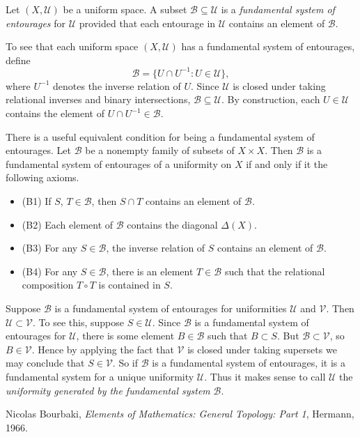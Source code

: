 \documentclass[12pt]{article}
\newcommand{\UU}{\mathcal{U}}
\newcommand{\VV}{\mathcal{V}}
\newcommand{\BB}{\mathcal{B}}
\begin{document}

Let $(X,\UU)$ be a uniform space.  A subset $\BB\subseteq\UU$ is a \emph{fundamental system of entourages} for $\UU$ provided that each entourage in $\UU$ contains an element of $\BB$.

To see that each uniform space $(X,\UU)$ has a fundamental system of entourages, define
\[
\BB = \{ U\cap U^{-1} \colon U \in \UU \},
\]
where $U^{-1}$ denotes the inverse relation of $U$.  Since $\UU$ is closed under taking relational inverses and binary intersections, $\BB\subseteq\UU$.  By construction, each $U\in\UU$ contains the element of $U\cap U^{-1}\in\BB$.

There is a useful equivalent condition for being a fundamental system of entourages.  Let $\BB$ be a nonempty family of subsets of $X\times X$.  Then $\BB$ is a fundamental system of entourages of a uniformity on $X$ if and only if it  the following axioms.
\begin{itemize}
\item
(B1) If $S$, $T\in\BB$, then $S\cap T$ contains an element of $\BB$.

\item
(B2) Each element of $\BB$ contains the diagonal $\Delta(X)$.

\item
(B3) For any $S\in\BB$, the inverse relation of $S$ contains an element of $\BB$.

\item
(B4) For any $S\in\BB$, there is an element $T\in\BB$ such that the relational composition $T\circ T$ is contained in $S$.
\end{itemize}

Suppose $\BB$ is a fundamental system of entourages for uniformities $\UU$ and $\VV$.  Then $\UU\subset\VV$.  To see this, suppose $S\in\UU$.  Since $\BB$ is a fundamental system of entourages for $\UU$, there is some element $B\in\BB$ such that $B\subset S$.  But $\BB\subset\VV$, so $B\in\VV$.  Hence by applying the fact that $\VV$ is closed under taking supersets we may conclude that $S\in\VV$.  So if $\BB$ is a fundamental system of entourages, it is a fundamental system for a unique uniformity $\UU$.  Thus it makes sense to call $\UU$ the \emph{uniformity generated by the fundamental system} $\BB$.


\begin{thebibliography}{9}
Nicolas Bourbaki, {\it Elements of Mathematics: General Topology: Part 1}, Hermann, 1966.
\end{thebibliography}
\end{document}
